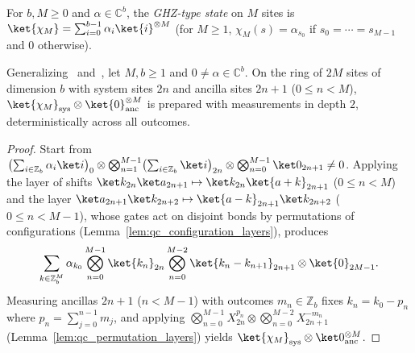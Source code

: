 \begin{definition}
    \label{def:qc_ghz_state}
    \leanok
    For $b,M\geq0$ and $\alpha\in\mathbb C^b$, the \emph{GHZ-type state} on $M$ sites is $\ket{\chi_M}=\sum_{i=0}^{b-1}\alpha_i\ket{i}^{\otimes M}$ (for $M\ge1$, $\chi_M(s)=\alpha_{s_0}$ if $s_0=\cdots=s_{M-1}$ and $0$ otherwise).
\end{definition}

\begin{theorem}
    \label{thm:qc_ghz_measurement}
    \leanok
    Generalizing~\cite[Example~1]{Piroli2021LOCC} and~\cite[paragraph ``Long-range MPS using measurements'']{Malz2024Preparation}, let $M,b\geq1$ and $0\neq\alpha\in\mathbb C^b$. On the ring of $2M$ sites of dimension $b$ with system sites $2n$ and ancilla sites $2n+1$ ($0\le n<M$), $\ket{\chi_M}_{\rm sys}\otimes\ket{0}^{\otimes M}_{\rm anc}$ is prepared with measurements in depth $2$, deterministically across all outcomes.
\end{theorem}
\begin{proof}
    \leanok
    Start from $\bigl(\sum_{i\in\mathbb Z_b}\alpha_i\ket i\bigr)_0\otimes\bigotimes_{n=1}^{M-1}\bigl(\sum_{i\in\mathbb Z_b}\ket i\bigr)_{2n}\otimes\bigotimes_{n=0}^{M-1}\ket 0_{2n+1}\neq0$. Applying the layer of shifts $\ket k_{2n}\ket a_{2n+1}\mapsto\ket k_{2n}\ket{a+k}_{2n+1}$ ($0\le n<M$) and the layer $\ket a_{2n+1}\ket k_{2n+2}\mapsto\ket{a-k}_{2n+1}\ket k_{2n+2}$ ($0\le n<M-1$), whose gates act on disjoint bonds by permutations of configurations (Lemma~\ref{lem:qc_configuration_layers}), produces
    \begin{align}
        \sum_{k\in\mathbb Z_b^M}\alpha_{k_0}\bigotimes_{n=0}^{M-1}\ket{k_n}_{2n}
        \bigotimes_{n=0}^{M-2}\ket{k_n-k_{n+1}}_{2n+1}\otimes\ket{0}_{2M-1}.\notag
    \end{align}
    Measuring ancillas $2n+1$ ($n<M-1$) with outcomes $m_n\in\mathbb Z_b$ fixes $k_n=k_0-p_n$ where $p_n=\sum_{j=0}^{n-1}m_j$, and applying $\bigotimes_{n=0}^{M-1}X^{p_n}_{2n}\otimes\bigotimes_{n=0}^{M-2}X^{-m_n}_{2n+1}$ (Lemma~\ref{lem:qc_permutation_layers}) yields $\ket{\chi_M}_{\rm sys}\otimes\ket 0^{\otimes M}_{\rm anc}$.
\end{proof}


